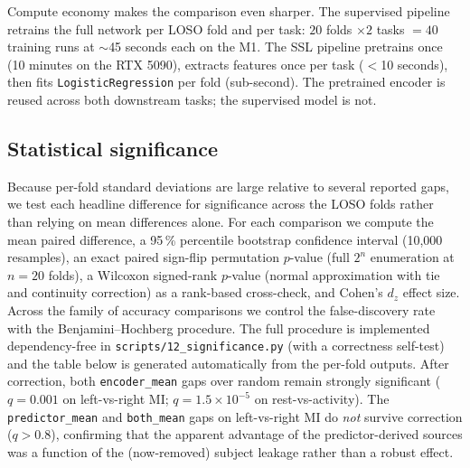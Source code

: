 Compute economy makes the comparison even sharper. The supervised
pipeline retrains the full network per LOSO fold and per task: $20$
folds $\times 2$ tasks $= 40$ training runs at $\sim$45 seconds each on
the M1. The SSL pipeline pretrains once (10 minutes on the RTX 5090),
extracts features once per task ($<$10 seconds), then fits
\texttt{LogisticRegression} per fold (sub-second). The pretrained
encoder is reused across both downstream tasks; the supervised model is
not.

\subsection{Statistical significance}
\label{sec:results:significance}

Because per-fold standard deviations are large relative to several reported
gaps, we test each headline difference for significance across the LOSO
folds rather than relying on mean differences alone. For each comparison we
compute the mean paired difference, a 95\,\% percentile bootstrap confidence
interval (10{,}000 resamples), an exact paired sign-flip permutation
$p$-value (full $2^{n}$ enumeration at $n{=}20$ folds), a Wilcoxon
signed-rank $p$-value (normal approximation with tie and continuity
correction) as a rank-based cross-check, and Cohen's $d_z$ effect size.
Across the family of accuracy comparisons we control the false-discovery
rate with the Benjamini--Hochberg procedure. The full procedure is
implemented dependency-free in \texttt{scripts/12\_significance.py} (with a
correctness self-test) and the table below is generated automatically from
the per-fold outputs.
After correction, both \texttt{encoder\_mean} gaps over random remain
strongly significant ($q{=}0.001$ on left-vs-right MI; $q{=}1.5\times
10^{-5}$ on rest-vs-activity). The \texttt{predictor\_mean} and
\texttt{both\_mean} gaps on left-vs-right MI do \emph{not} survive
correction ($q{>}0.8$), confirming that the apparent advantage of the
predictor-derived sources was a function of the (now-removed) subject
leakage rather than a robust effect.

  {}
  {}

